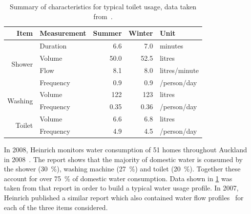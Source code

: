     \begin{table}
      \centering
      \begin{tabular}{r l|r|r|l}
        Item & Measurement & Summer & Winter & Unit\\
        \hline\hline
        \multirow{4}{*}{Shower} & Duration & 6.6 & 7.0 & minutes\\
                                & Volume & 50.0 & 52.5 & litres\\
                                & Flow & 8.1 & 8.0 & litres/minute\\
                                & Frequency & 0.9 & 0.9 & /person/day\\
        \hline
        \multirow{2}{*}{Washing}& Volume & 122 & 123 & litres\\
                                & Frequency & 0.35 & 0.36 & /person/day\\
        \hline
        \multirow{2}{*}{Toilet} & Volume & 6.6 & 6.8 & litres\\
                                & Frequency & 4.9 & 4.5 & /person/day\\
      \end{tabular}
      \caption{\label{tab:consumption_figures}Summary of characteristics for typical toilet usage, data taken from~\cite{Heinrich2008}.}
    \end{table}

    In 2008, Heinrich monitors water consumption of 51 homes throughout Auckland in 2008~\cite{Heinrich2008}.
    The report shows that the majority of domestic water is consumed by the shower (\SI{30}{\percent}), washing machine (\SI{27}{\percent}) and toilet (\SI{20}{\percent}).
    Together these account for over \SI{75}{\percent} of domestic water consumption.
    Data shown in \cref{tab:consumption_figures} was taken from that report in order to build a typical water usage profile.
    In 2007, Heinrich published a similar report which also contained water flow profiles~\cite{Heinrich2007} for each of the three items considered.

